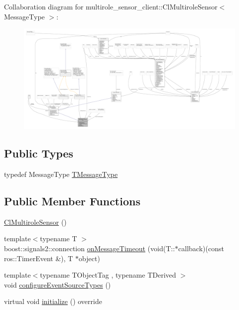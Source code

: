 Collaboration diagram for multirole\+\_\+sensor\+\_\+client\+:\+:Cl\+Multirole\+Sensor$<$ Message\+Type $>$\+:\nopagebreak
\begin{figure}[H]
\begin{center}
\leavevmode
\includegraphics[width=350pt]{classmultirole__sensor__client_1_1ClMultiroleSensor__coll__graph}
\end{center}
\end{figure}
\subsection*{Public Types}
\begin{DoxyCompactItemize}
\item 
typedef Message\+Type \hyperlink{classmultirole__sensor__client_1_1ClMultiroleSensor_af6273a0b7c896dad766130706984071f}{T\+Message\+Type}
\end{DoxyCompactItemize}
\subsection*{Public Member Functions}
\begin{DoxyCompactItemize}
\item 
\hyperlink{classmultirole__sensor__client_1_1ClMultiroleSensor_a1d122d732da85dd3841096f294a8161e}{Cl\+Multirole\+Sensor} ()
\item 
{\footnotesize template$<$typename T $>$ }\\boost\+::signals2\+::connection \hyperlink{classmultirole__sensor__client_1_1ClMultiroleSensor_a525e83af3d81dff01600cfd6627890c5}{on\+Message\+Timeout} (void(T\+::$\ast$callback)(const ros\+::\+Timer\+Event \&), T $\ast$object)
\item 
{\footnotesize template$<$typename T\+Object\+Tag , typename T\+Derived $>$ }\\void \hyperlink{classmultirole__sensor__client_1_1ClMultiroleSensor_a243e8ec849d380d5934a384521423c9a}{configure\+Event\+Source\+Types} ()
\item 
virtual void \hyperlink{classmultirole__sensor__client_1_1ClMultiroleSensor_a8cd8e9766dd4e0f4d3be69d7979c5e50}{initialize} () override
\end{DoxyCompactItemize}
